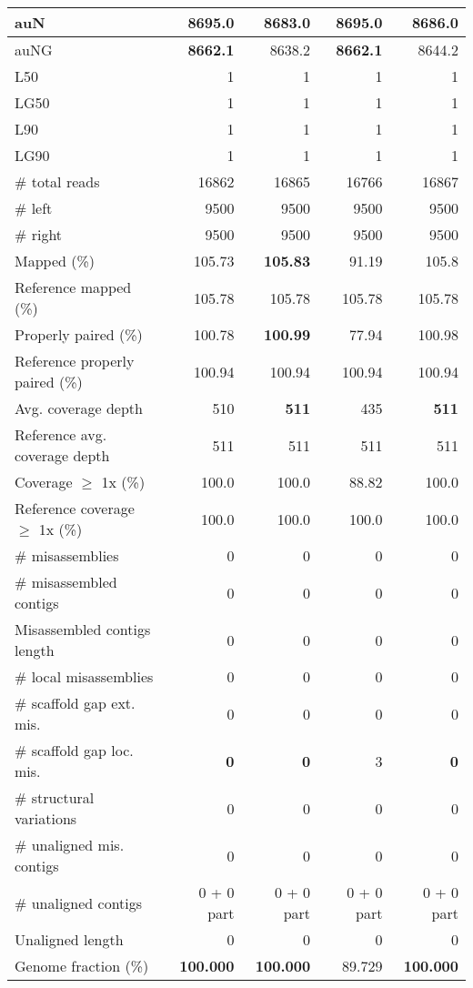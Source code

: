 \documentclass[12pt,a4paper]{article}
\begin{document}
\begin{table}[ht]
\begin{center}
\begin{tabular}{|l*{4}{|r}|}
auN & {\bf 8695.0} & 8683.0 & {\bf 8695.0} & 8686.0 \\ \hline
auNG & {\bf 8662.1} & 8638.2 & {\bf 8662.1} & 8644.2 \\ \hline
L50 & 1 & 1 & 1 & 1 \\ \hline
LG50 & 1 & 1 & 1 & 1 \\ \hline
L90 & 1 & 1 & 1 & 1 \\ \hline
LG90 & 1 & 1 & 1 & 1 \\ \hline
\# total reads & 16862 & 16865 & 16766 & 16867 \\ \hline
\# left & 9500 & 9500 & 9500 & 9500 \\ \hline
\# right & 9500 & 9500 & 9500 & 9500 \\ \hline
Mapped (\%) & 105.73 & {\bf 105.83} & 91.19 & 105.8 \\ \hline
Reference mapped (\%) & 105.78 & 105.78 & 105.78 & 105.78 \\ \hline
Properly paired (\%) & 100.78 & {\bf 100.99} & 77.94 & 100.98 \\ \hline
Reference properly paired (\%) & 100.94 & 100.94 & 100.94 & 100.94 \\ \hline
Avg. coverage depth & 510 & {\bf 511} & 435 & {\bf 511} \\ \hline
Reference avg. coverage depth & 511 & 511 & 511 & 511 \\ \hline
Coverage $\geq$ 1x (\%) & 100.0 & 100.0 & 88.82 & 100.0 \\ \hline
Reference coverage $\geq$ 1x (\%) & 100.0 & 100.0 & 100.0 & 100.0 \\ \hline
\# misassemblies & 0 & 0 & 0 & 0 \\ \hline
\# misassembled contigs & 0 & 0 & 0 & 0 \\ \hline
Misassembled contigs length & 0 & 0 & 0 & 0 \\ \hline
\# local misassemblies & 0 & 0 & 0 & 0 \\ \hline
\# scaffold gap ext. mis. & 0 & 0 & 0 & 0 \\ \hline
\# scaffold gap loc. mis. & {\bf 0} & {\bf 0} & 3 & {\bf 0} \\ \hline
\# structural variations & 0 & 0 & 0 & 0 \\ \hline
\# unaligned mis. contigs & 0 & 0 & 0 & 0 \\ \hline
\# unaligned contigs & 0 + 0 part & 0 + 0 part & 0 + 0 part & 0 + 0 part \\ \hline
Unaligned length & 0 & 0 & 0 & 0 \\ \hline
Genome fraction (\%) & {\bf 100.000} & {\bf 100.000} & 89.729 & {\bf 100.000} \\ \hline

\end{tabular}
\end{center}
\end{table}
\end{document}
